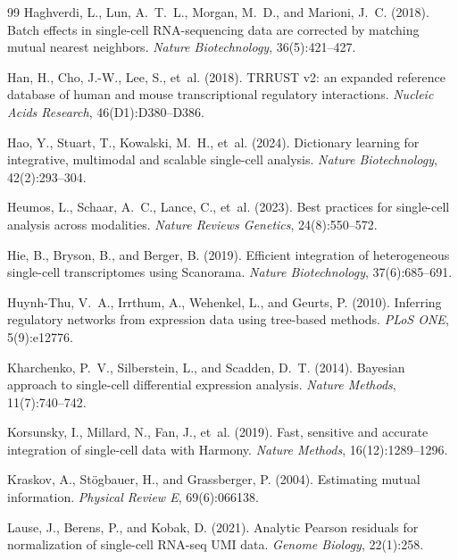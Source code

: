 \documentclass[12pt]{article}
\begin{document}
\begin{thebibliography}{99}
Haghverdi, L., Lun, A.~T.~L., Morgan, M.~D., and Marioni, J.~C. (2018).
\newblock Batch effects in single-cell RNA-sequencing data are corrected by
  matching mutual nearest neighbors.
\newblock \textit{Nature Biotechnology}, 36(5):421--427.

Han, H., Cho, J.-W., Lee, S., et~al. (2018).
\newblock TRRUST v2: an expanded reference database of human and mouse
  transcriptional regulatory interactions.
\newblock \textit{Nucleic Acids Research}, 46(D1):D380--D386.

Hao, Y., Stuart, T., Kowalski, M.~H., et~al. (2024).
\newblock Dictionary learning for integrative, multimodal and scalable
  single-cell analysis.
\newblock \textit{Nature Biotechnology}, 42(2):293--304.

Heumos, L., Schaar, A.~C., Lance, C., et~al. (2023).
\newblock Best practices for single-cell analysis across modalities.
\newblock \textit{Nature Reviews Genetics}, 24(8):550--572.

Hie, B., Bryson, B., and Berger, B. (2019).
\newblock Efficient integration of heterogeneous single-cell transcriptomes
  using Scanorama.
\newblock \textit{Nature Biotechnology}, 37(6):685--691.

Huynh-Thu, V.~A., Irrthum, A., Wehenkel, L., and Geurts, P. (2010).
\newblock Inferring regulatory networks from expression data using tree-based
  methods.
\newblock \textit{PLoS ONE}, 5(9):e12776.

Kharchenko, P.~V., Silberstein, L., and Scadden, D.~T. (2014).
\newblock Bayesian approach to single-cell differential expression analysis.
\newblock \textit{Nature Methods}, 11(7):740--742.

Korsunsky, I., Millard, N., Fan, J., et~al. (2019).
\newblock Fast, sensitive and accurate integration of single-cell data with
  Harmony.
\newblock \textit{Nature Methods}, 16(12):1289--1296.

Kraskov, A., St{\"o}gbauer, H., and Grassberger, P. (2004).
\newblock Estimating mutual information.
\newblock \textit{Physical Review E}, 69(6):066138.

Lause, J., Berens, P., and Kobak, D. (2021).
\newblock Analytic Pearson residuals for normalization of single-cell RNA-seq
  UMI data.
\newblock \textit{Genome Biology}, 22(1):258.


\end{thebibliography}
\end{document}
